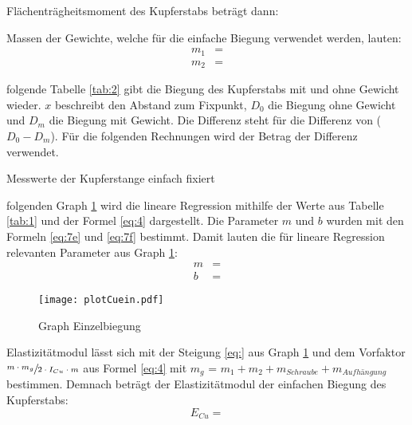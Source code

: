 \justifying Flächenträgheitsmoment des Kupferstabs beträgt dann:


\justifying Massen der Gewichte, welche für die einfache Biegung verwendet werden, lauten:
\begin{subequations}\label{eq:}
\begin{align}
    m_1 &= \text{} \label{eq:a}\\
    m_2 &= \text{} \label{eq:b}
\end{align}
\end{subequations}

\justifying folgende Tabelle \ref{tab:2} gibt die Biegung des Kupferstabs mit und ohne Gewicht wieder. $x$ beschreibt den Abstand zum Fixpunkt, $D_0$
die Biegung ohne Gewicht und $D_m$ die Biegung mit Gewicht. Die Differenz steht für die Differenz von ($D_0-D_m$). Für die folgenden Rechnungen
wird der Betrag der Differenz verwendet.
\begin{table}[H]
    \centering
    
    \caption{Messwerte der Kupferstange einfach fixiert}
    \label{tab:2}
\end{table}

\justifying folgenden Graph \ref{fig:1} wird die lineare Regression mithilfe der Werte aus Tabelle \ref{tab:1} und der Formel \eqref{eq:4} dargestellt.
Die Parameter $m$ und $b$ wurden mit den Formeln \eqref{eq:7e} und \eqref{eq:7f} bestimmt.
Damit lauten die für lineare Regression relevanten Parameter aus Graph \ref{fig:1}:
\begin{align}
    m &= \text{} \label{eq:}\\
    b &= \text{} \label{eq:}
\end{align}

\begin{figure}[H]
    \centering
    \texttt{[image: plotCuein.pdf]}
    \caption{Graph Einzelbiegung}
    \label{fig:1}
\end{figure}

\justifying Elastizitätmodul lässt sich mit der Steigung \eqref{eq:} aus Graph \ref{fig:1} und dem Vorfaktor 
$\sfrac{m \cdot m_g}{2 \cdot I_{Cu} \cdot m}$ aus Formel \eqref{eq:4} mit $m_g$ = $m_1 + m_2 + m_{Schraube} + m_{Aufhängung}$ bestimmen. 
Demnach beträgt der Elastizitätmodul der einfachen Biegung des Kupferstabs:
\begin{equation}
E_{Cu} =  \label{eq:}
\end{equation}

